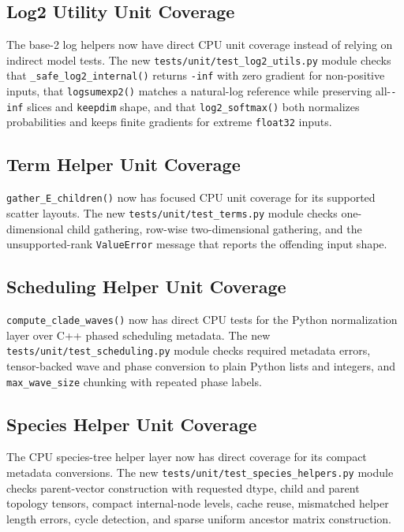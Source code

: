 \documentclass[11pt]{article}
\begin{document}
\subsection{Log2 Utility Unit Coverage}

The base-2 log helpers now have direct CPU unit coverage instead of relying on
indirect model tests.  The new \texttt{tests/unit/test\_log2\_utils.py} module
checks that \texttt{\_safe\_log2\_internal()} returns \texttt{-inf} with zero
gradient for non-positive inputs, that \texttt{logsumexp2()} matches a
natural-log reference while preserving all-\texttt{-inf} slices and
\texttt{keepdim} shape, and that \texttt{log2\_softmax()} both normalizes
probabilities and keeps finite gradients for extreme \texttt{float32} inputs.

\subsection{Term Helper Unit Coverage}

\texttt{gather\_E\_children()} now has focused CPU unit coverage for its
supported scatter layouts.  The new \texttt{tests/unit/test\_terms.py} module
checks one-dimensional child gathering, row-wise two-dimensional gathering, and
the unsupported-rank \texttt{ValueError} message that reports the offending
input shape.

\subsection{Scheduling Helper Unit Coverage}

\texttt{compute\_clade\_waves()} now has direct CPU tests for the Python
normalization layer over C++ phased scheduling metadata.  The new
\texttt{tests/unit/test\_scheduling.py} module checks required metadata errors,
tensor-backed wave and phase conversion to plain Python lists and integers, and
\texttt{max\_wave\_size} chunking with repeated phase labels.

\subsection{Species Helper Unit Coverage}

The CPU species-tree helper layer now has direct coverage for its compact
metadata conversions.  The new \texttt{tests/unit/test\_species\_helpers.py}
module checks parent-vector construction with requested dtype, child and parent
topology tensors, compact internal-node levels, cache reuse, mismatched helper
length errors, cycle detection, and sparse uniform ancestor matrix construction.
\end{document}
